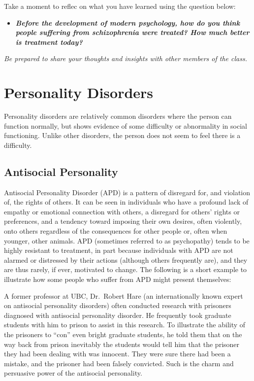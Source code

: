 \documentclass[
]{book}
\providecommand{\tightlist}{%
  \setlength{\itemsep}{0pt}\setlength{\parskip}{0pt}}
\begin{document}
\begin{reflect}
Take a moment to reflec on what you have learned using the question below:

\begin{itemize}
\tightlist
\item
  \textbf{\emph{Before the development of modern psychology, how do you think people suffering from schizophrenia were treated? How much better is treatment today?}}
\end{itemize}

\emph{Be prepared to share your thoughts and insights with other members of the class.}
\end{reflect}

\hypertarget{personality-disorders}{%
\section{Personality Disorders}\label{personality-disorders}}

Personality disorders are relatively common disorders where the person can function normally, but shows evidence of some difficulty or abnormality in social functioning. Unlike other disorders, the person does not seem to feel there is a difficulty.

\hypertarget{antisocial-personality}{%
\subsection*{Antisocial Personality}\label{antisocial-personality}}

Antisocial Personality Disorder (APD) is a pattern of disregard for, and violation of, the rights of others. It can be seen in individuals who have a profound lack of empathy or emotional connection with others, a disregard for others' rights or preferences, and a tendency toward imposing their own desires, often violently, onto others regardless of the consequences for other people or, often when younger, other animals. APD (sometimes referred to as psychopathy) tends to be highly resistant to treatment, in part because individuals with APD are not alarmed or distressed by their actions (although others frequently are), and they are thus rarely, if ever, motivated to change. The following is a short example to illustrate how some people who suffer from APD might present themselves:

A former professor at UBC, Dr.~Robert Hare (an internationally known expert on antisocial personality disorders) often conducted research with prisoners diagnosed with antisocial personality disorder. He frequently took graduate students with him to prison to assist in this research. To illustrate the ability of the prisoners to ``con'' even bright graduate students, he told them that on the way back from prison inevitably the students would tell him that the prisoner they had been dealing with was innocent. They were sure there had been a mistake, and the prisoner had been falsely convicted. Such is the charm and persuasive power of the antisocial personality.
\end{document}
